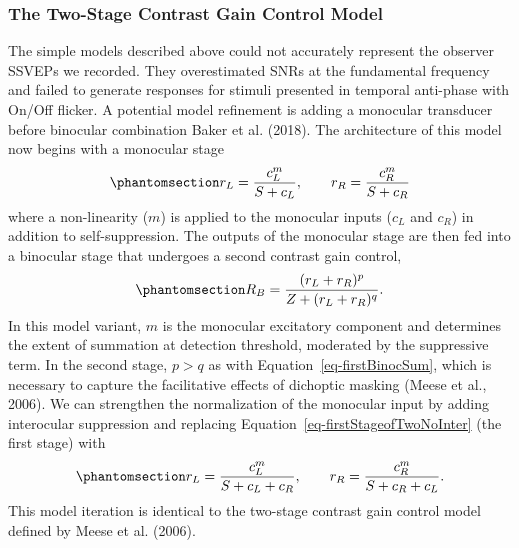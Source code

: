 \documentclass[
  12pt,
]{article}
\begin{document}
\subsubsection{The Two-Stage Contrast Gain Control
Model}\label{the-two-stage-contrast-gain-control-model}

The simple models described above could not accurately represent the
observer SSVEPs we recorded. They overestimated SNRs at the fundamental
frequency and failed to generate responses for stimuli presented in
temporal anti-phase with On/Off flicker. A potential model refinement is
adding a monocular transducer before binocular combination Baker et al.
(2018). The architecture of this model now begins with a monocular stage
\begin{equation}\phantomsection\label{eq-firstStageofTwoNoInter}{
r_L = \frac{c_L^m}{S + c_L}, \qquad r_R = \frac{c_R^m}{S + c_R}
}\end{equation} where a non-linearity (\(m\)) is applied to the
monocular inputs (\(c_L\) and \(c_R\)) in addition to self-suppression.
The outputs of the monocular stage are then fed into a binocular stage
that undergoes a second contrast gain control,
\begin{equation}\phantomsection\label{eq-binocComb}{
R_{B} = \frac{(r_L+r_R)^p}{Z+(r_L+r_R)^q}.
}\end{equation} In this model variant, \(m\) is the monocular excitatory
component and determines the extent of summation at detection threshold,
moderated by the suppressive term. In the second stage, \(p > q\) as
with Equation~\ref{eq-firstBinocSum}, which is necessary to capture the
facilitative effects of dichoptic masking (Meese et al., 2006). We can
strengthen the normalization of the monocular input by adding
interocular suppression and replacing
Equation~\ref{eq-firstStageofTwoNoInter} (the first stage) with
\begin{equation}\phantomsection\label{eq-firstStageofTwo}{
r_{L} = \frac{c_L^m}{S + c_L + c_R}, \qquad r_R = \frac{c_R^m}{S + c_R + c_L}.
}\end{equation} This model iteration is identical to the two-stage
contrast gain control model defined by Meese et al. (2006).
\end{document}
